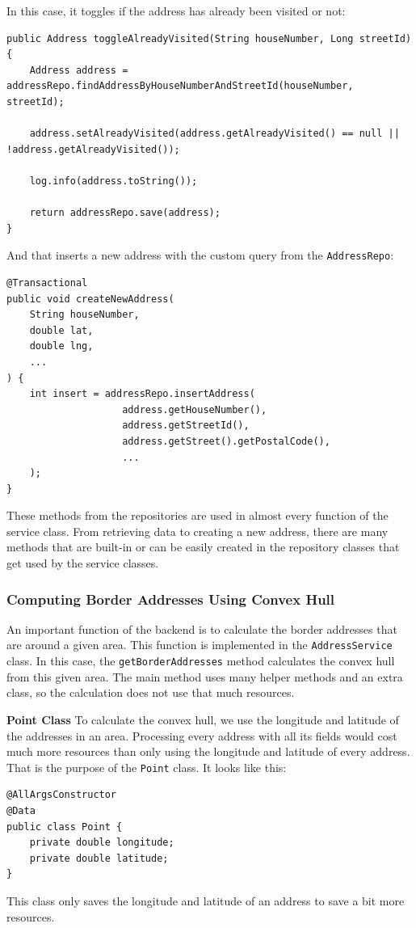     \blankLine

    In this case, it toggles if the address has already been visited or not:
    \begin{verbatim}
public Address toggleAlreadyVisited(String houseNumber, Long streetId) {
    Address address = addressRepo.findAddressByHouseNumberAndStreetId(houseNumber, streetId);
    
    address.setAlreadyVisited(address.getAlreadyVisited() == null || !address.getAlreadyVisited());
    
    log.info(address.toString());
    
    return addressRepo.save(address);
}
    \end{verbatim}

    And that inserts a new address with the custom query from the \texttt{AddressRepo}: 
    \begin{verbatim}
@Transactional
public void createNewAddress(
    String houseNumber,
    double lat,
    double lng,
    ...
) {
    int insert = addressRepo.insertAddress(
                    address.getHouseNumber(),
                    address.getStreetId(),
                    address.getStreet().getPostalCode(),
                    ...
    );
}    
    \end{verbatim}

    These methods from the repositories are used in almost every function of the service class. From retrieving data to creating a new address, there are many methods that are built-in or can be easily created in the repository classes that get used by the service classes.

    \subsubsection{Computing Border Addresses Using Convex Hull}
    An important function of the backend is to calculate the border addresses that are around a given area. This function is implemented in the \texttt{AddressService} class. In this case, the \texttt{getBorderAddresses} method calculates the convex hull from this given area. The main method uses many helper methods and an extra class, so the calculation does not use that much resources. 
    
    \pagebreak
    
    \textbf{Point Class} \newline
    To calculate the convex hull, we use the longitude and latitude of the addresses in an area. Processing every address with all its fields would cost much more resources than only using the longitude and latitude of every address. That is the purpose of the \texttt{Point} class. It looks like this: 
    \begin{verbatim}
@AllArgsConstructor
@Data
public class Point {
    private double longitude;
    private double latitude;
}
    \end{verbatim}
    This class only saves the longitude and latitude of an address to save a bit more resources. \newline

